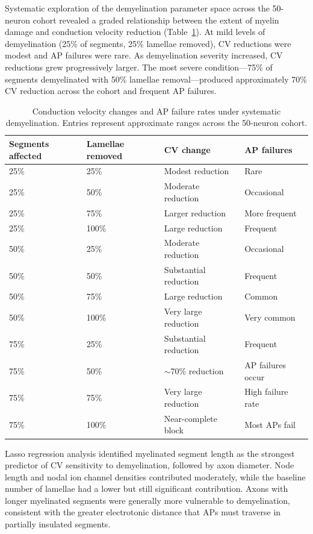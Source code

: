 \documentclass[11pt]{article}
\begin{document}
Systematic exploration of the demyelination parameter space across the 50-neuron cohort revealed a graded relationship between the extent of myelin damage and conduction velocity reduction (Table~\ref{tab:demyelin_cv}). At mild levels of demyelination (25\% of segments, 25\% lamellae removed), CV reductions were modest and AP failures were rare. As demyelination severity increased, CV reductions grew progressively larger. The most severe condition---75\% of segments demyelinated with 50\% lamellae removal---produced approximately 70\% CV reduction across the cohort and frequent AP failures.

\begin{table}[ht]
\centering
\caption{Conduction velocity changes and AP failure rates under systematic demyelination. Entries represent approximate ranges across the 50-neuron cohort.}
\label{tab:demyelin_cv}
\begin{tabular}{llll}
\toprule
Segments affected & Lamellae removed & CV change & AP failures \\
\midrule
25\% & 25\% & Modest reduction & Rare \\
25\% & 50\% & Moderate reduction & Occasional \\
25\% & 75\% & Larger reduction & More frequent \\
25\% & 100\% & Large reduction & Frequent \\
50\% & 25\% & Moderate reduction & Occasional \\
50\% & 50\% & Substantial reduction & Frequent \\
50\% & 75\% & Large reduction & Common \\
50\% & 100\% & Very large reduction & Very common \\
75\% & 25\% & Substantial reduction & Frequent \\
75\% & 50\% & $\sim$70\% reduction & AP failures occur \\
75\% & 75\% & Very large reduction & High failure rate \\
75\% & 100\% & Near-complete block & Most APs fail \\
\bottomrule
\end{tabular}
\end{table}

Lasso regression analysis identified myelinated segment length as the strongest predictor of CV sensitivity to demyelination, followed by axon diameter. Node length and nodal ion channel densities contributed moderately, while the baseline number of lamellae had a lower but still significant contribution. Axons with longer myelinated segments were generally more vulnerable to demyelination, consistent with the greater electrotonic distance that APs must traverse in partially insulated segments.
\end{document}

